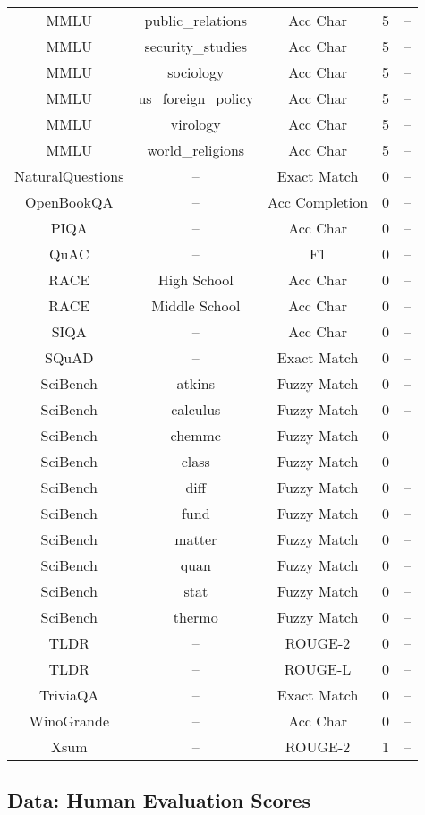 \begin{longtable}{|c|c|c|c|c|}
    MMLU & public\_relations & Acc Char & 5 & -- \\
    MMLU & security\_studies & Acc Char & 5 & -- \\
    MMLU & sociology & Acc Char & 5 & -- \\
    MMLU & us\_foreign\_policy & Acc Char & 5 & -- \\
    MMLU & virology & Acc Char & 5 & -- \\
    MMLU & world\_religions & Acc Char & 5 & -- \\
    NaturalQuestions & -- & Exact Match & 0 & -- \\
    OpenBookQA & -- & Acc Completion & 0 & -- \\
    PIQA & -- & Acc Char & 0 & -- \\
    QuAC & -- & F1 & 0 & -- \\
    RACE & High School & Acc Char & 0 & -- \\
    RACE & Middle School & Acc Char & 0 & -- \\
    SIQA & -- & Acc Char & 0 & -- \\
    SQuAD & -- & Exact Match & 0 & -- \\
    SciBench & atkins & Fuzzy Match & 0 & -- \\
    SciBench & calculus & Fuzzy Match & 0 & -- \\
    SciBench & chemmc & Fuzzy Match & 0 & -- \\
    SciBench & class & Fuzzy Match & 0 & -- \\
    SciBench & diff & Fuzzy Match & 0 & -- \\
    SciBench & fund & Fuzzy Match & 0 & -- \\
    SciBench & matter & Fuzzy Match & 0 & -- \\
    SciBench & quan & Fuzzy Match & 0 & -- \\
    SciBench & stat & Fuzzy Match & 0 & -- \\
    SciBench & thermo & Fuzzy Match & 0 & -- \\
    TLDR & -- & ROUGE-2 & 0 & -- \\
    TLDR & -- & ROUGE-L & 0 & -- \\
    TriviaQA & -- & Exact Match & 0 & -- \\
    WinoGrande & -- & Acc Char & 0 & -- \\
    Xsum & -- & ROUGE-2 & 1 & -- \\
    \hline
\end{longtable}


\subsection{Data: Human Evaluation Scores}
\label{app:sec:experimental_methodology:human_evals}

